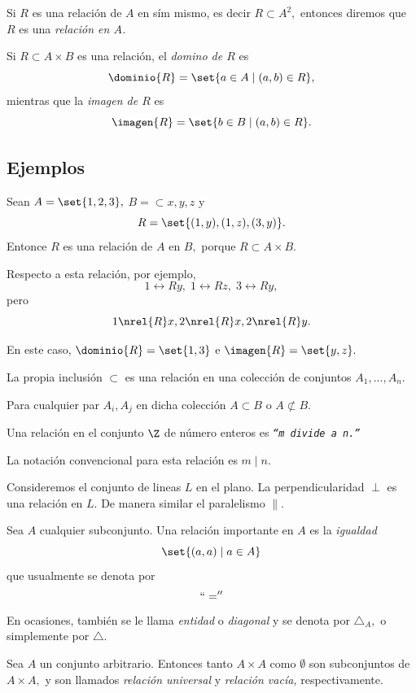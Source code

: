 	Si $R$ es una relación de $A$ en sím mismo, es decir $R \subset A^{2},$ entonces diremos que $R$ es una \emph{relación en $A$.}



	\begin{definicion}
		Si $R \subset A \times B$ es una relación, el \emph{domino de $R$} es
		$$
		\dominio{R}=\set{a\in A\mid (a,b)\in R},
		$$ mientras que la \emph{imagen de $R$} es
		$$
		\imagen{R}=\set{b\in B\mid (a,b)\in R}.
		$$
	\end{definicion}



\subsection{Ejemplos}

	Sean $A=\set{1,2,3},$ $B=\subset{x,y,z}$ y $$R=\set{(1,y), (1,z), (3,y)}.$$ Entonce $R$ es una relación de $A$ en $B,$ porque $R \subset A \times B.$


	Respecto a esta relación, por ejemplo,
	$$
	1\rel{R}y, \; 1\rel{R}z, \; 3\rel{R}y,
	$$ pero
	$$
	1\nrel{R}x, 2\nrel{R}x, 2\nrel{R}y.
	$$


	En este caso, $\dominio{R}=\set{1,3}$ e $\imagen{R}=\set{y,z}.$



	La propia inclusión $\subset$ es una relación en una colección de conjuntos $A_{1},...,A_{n}.$

	Para cualquier par $A_{i}, A_{j}$ en dicha colección $A \subset B$ o $A \not\subset B.$



	Una relación en el conjunto $\Z$ de número enteros es \emph{\texttt{``$m$ divide a $n.$''}}


	La notación convencional para esta relación es \emph{$m \mid n.$}



	Consideremos el conjunto de lineas $L$ en el plano. La perpendicularidad $\perp$ es una relación en $L.$  De manera similar el paralelismo $\parallel.$



	Sea $A$ cualquier subconjunto. Una relación importante en $A$ es la \emph{igualdad}
	$$
	\set{(a,a) \mid a \in A}
	$$ que usualmente se denota por \emph{$$``=''$$}
	 En ocasiones, tambi\'en se le llama \emph{entidad} o \emph{diagonal} y se denota por $\triangle_{A},$ o simplemente por $\triangle.$



	Sea $A$ un conjunto arbitrario. Entonces tanto $A\times A$ como $\emptyset$ son subconjuntos de $A \times A,$ y son llamados \emph{relación universal} y \emph{relación vacía,} respectivamente.




